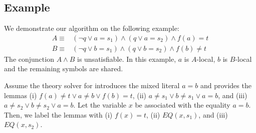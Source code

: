 \subsection{Example}

We demonstrate our algorithm on the following example:
\begin{align*}
  A\equiv&(\lnot q \lor a=s_1)\land(q \lor a=s_2)\land f(a)=t\\
  B\equiv&(\lnot q \lor b=s_1)\land(q \lor b=s_2)\land f(b)\neq t
\end{align*}
The conjunction $A\land B$ is unsatisfiable.  In this example, $a$ is
$A$-local, $b$ is $B$-local and the remaining symbols are shared.

Assume the theory solver for \euf introduces the mixed literal $a=b$ and
provides the lemmas (i) $f(a)\neq t\lor a\neq b\lor 
f(b)=t$, (ii) $a\neq s_1\lor b\neq s_1\lor a=b$, and (iii) $a\neq
s_2\lor b\neq s_2\lor a=b$.  
Let the variable $x$ be
associated with the equality $a=b$.  Then, we label the lemmas with (i)
$f(x)=t$, (ii) $EQ(x,s_1)$, and (iii) $EQ(x,s_2)$.


